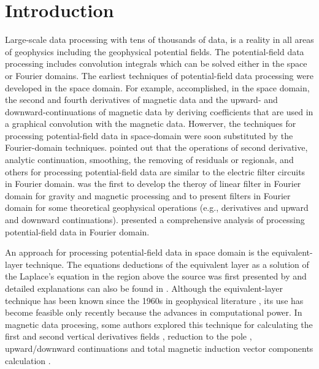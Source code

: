 \documentclass[manuscript]{geophysics}
\begin{document}
	\section{Introduction}
	
	Large-scale data processing with tens of thousands of data, is a reality in all areas of geophysics including the geophysical potential fields. 
	The potential-field data processing includes convolution integrals which can be solved either in the space or Fourier domains.
	The earliest techniques of potential-field data processing  were developed in the space domain.
	For example, \cite{Peters1949} accomplished, in the space domain, the second and fourth derivatives of magnetic data and the upward- and downward-continuations of magnetic data by deriving coefficients that are
	used in a  graphical convolution with the magnetic data.
	Howerver, the techniques for  processing potential-field data in space-domain were soon substituted by the Fourier-domain techniques. 
	\cite{Dean1958} pointed out that the operations of second derivative, analytic continuation, smoothing, the removing of residuals or regionals, and others for processing  potential-field data are
	similar to the electric filter circuits in Fourier domain.
	\cite{Dean1958} was the first to develop the theroy of  linear filter in Fourier domain for gravity and magnetic processing and to present filters in Fourier domain \citep[][ see Table I, p 113]{Dean1958} 
	for some theoretical geophysical operations (e.g., derivatives and upward and downward continuations).
	\cite{GUNN1975} presented a comprehensive analysis of processing potential-field data in Fourier domain.
	
	
	An approach for processing potential-field data in space domain is the equivalent-layer technique.
	The equations deductions of the equivalent layer as a solution of the Laplace's equation in the region above the source was first presented by \cite{kellogg1929} and detailed explanations can also be found in \cite{blakely1996}. 
	Although the equivalent-layer technique  has been known since the 1960s in geophysical literature \citep{danes1961structure,bott1967solution,dampney1969}, its use has become feasible only recently 
	because the advances in computational power.
	In magnetic data procesing, some authors explored this technique for calculating the first and second vertical derivatives fields \citep{emilia1973}, reduction to the pole \citep{silva1986,oliveirajr-etal2013,li2014using}, upward/downward continuations \citep{hansen-miyazaki1984,li-oldenburg2010} and total magnetic induction vector components calculation \citep{sun2019constrained}.
	
\end{document}
